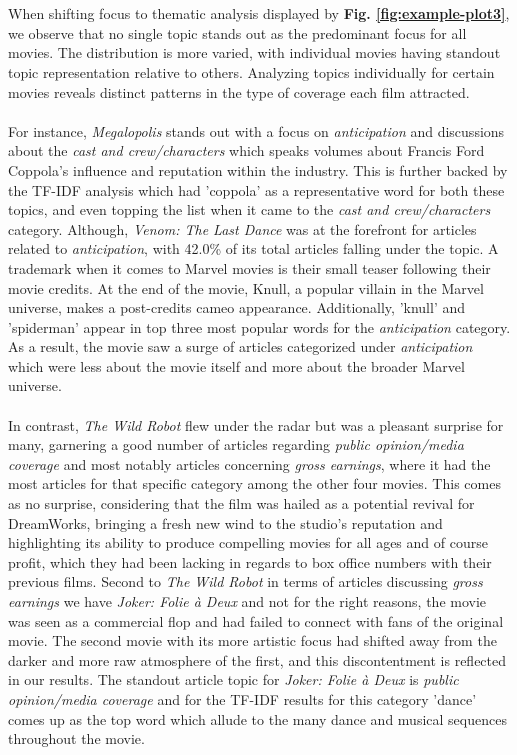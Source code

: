 \documentclass[letterpaper]{article} %
\begin{document}
\\
\\
When shifting focus to thematic analysis displayed by \textbf{Fig. \ref{fig:example-plot3}}, we observe that no single topic stands out as the predominant focus for all movies. The distribution is more varied, with individual movies having standout topic representation relative to others. Analyzing topics individually for certain movies reveals distinct patterns in the type of coverage each film attracted. 
\\
\\
For instance, \textit{Megalopolis} stands out with a focus on \textit{anticipation} and discussions about the \textit{cast and crew/characters} which speaks volumes about Francis Ford Coppola's influence and reputation within the industry. This is further backed by the TF-IDF analysis which had 'coppola' as a representative word for both these topics, and even topping the list when it came to the \textit{cast and crew/characters} category. Although, \textit{Venom: The Last Dance} was at the forefront for articles related to \textit{anticipation}, with 42.0\% of its total articles falling under the topic. A trademark when it comes to Marvel movies is their small teaser following their movie credits. At the end of the movie, Knull, a popular villain in the Marvel universe, makes a post-credits cameo appearance. Additionally, 'knull' and 'spiderman' appear in top three most popular words for the \textit{anticipation} category. As a result, the movie saw a surge of articles categorized under \textit{anticipation} which were less about the movie itself and more about the broader Marvel universe. 
\\ 
\\
In contrast, \textit{The Wild Robot} flew under the radar but was a pleasant surprise for many, garnering a good number of articles regarding \textit{public opinion/media coverage} and most notably articles concerning \textit{gross earnings}, where it had the most articles for that specific category among the other four movies. This comes as no surprise, considering that the film was hailed as a potential revival for DreamWorks, bringing a fresh new wind to the studio's reputation and highlighting its ability to produce compelling movies for all ages and of course profit, which they had been lacking in regards to box office numbers with their previous films. Second to \textit{The Wild Robot} in terms of articles discussing \textit{gross earnings} we have \textit{Joker: Folie à Deux} and not for the right reasons, the movie was seen as a commercial flop and had failed to connect with fans of the original movie. The second movie with its more artistic focus had shifted away from the darker and more raw atmosphere of the first, and this discontentment is reflected in our results. The standout article topic for \textit{Joker: Folie à Deux} is \textit{public opinion/media coverage} and for the TF-IDF results for this category 'dance' comes up as the top word which allude to the many dance and musical sequences throughout the movie. 
\end{document}
